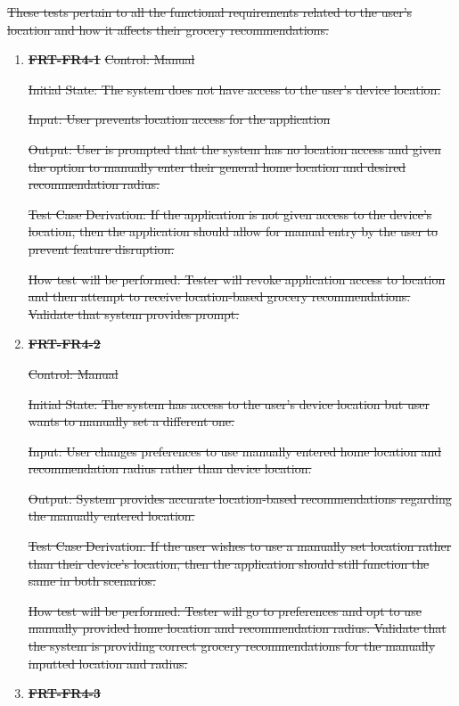 \documentclass[12pt, titlepage]{article}
\begin{document}
\sout{
These tests pertain to all the functional requirements related to the user's location and how it affects their grocery recommendations.}

\begin{enumerate}

\item{\sout{\textbf{FRT-FR4-1}}}
\sout{Control: Manual}
          
\sout{Initial State: The system does not have access to the user's device location.}

\sout{Input: User prevents location access for the application}
          
\sout{Output: User is prompted that the system has no location access and given the option to manually enter their general home location and desired recommendation radius.}

\sout{Test Case Derivation: If the application is not given access to the device's location, then the application should allow for
manual entry by the user to prevent feature disruption.}
          
\sout{How test will be performed: Tester will revoke application access to location  and then attempt to receive location-based grocery recommendations. Validate that system provides prompt.}


\item{\sout{\textbf{FRT-FR4-2}}}

\sout{Control: Manual}
          
\sout{Initial State: The system has access to the user's device location but user wants to manually set a different one.}

\sout{Input: User changes preferences to use manually entered home location and recommendation radius rather than device location.}
          
\sout{Output: System provides accurate location-based recommendations regarding the manually entered location.}

\sout{Test Case Derivation: If the user wishes to use a manually set location rather than their device's location, then the
application should still function the same in both scenarios.}
          
\sout{How test will be performed: Tester will go to preferences and opt to use manually provided home location and recommendation radius. Validate that the system is providing correct grocery recommendations for the manually inputted location and radius.}

\item{\sout{\textbf{FRT-FR4-3}}}


\end{enumerate}
\end{document}
